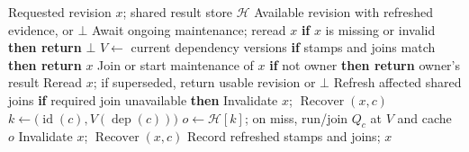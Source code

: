 \begin{algorithm}[t]
\caption{}
\label{alg:maintenance}
\normalsize
\begin{algorithmic}[1]
\Require Requested revision $x$; shared result store $\mathcal H$
\Ensure Available revision with refreshed evidence, or $\bot$
\State Await ongoing maintenance; reread $x$
\State \textbf{if} $x$ is missing or invalid \textbf{then return} $\bot$
\State $V\gets$ current dependency versions
\State \textbf{if} stamps and joins match \textbf{then return} $x$
\State Join or start maintenance of $x$
\State \textbf{if} not owner \textbf{then return} owner's result
\State Reread $x$; if superseded, return usable revision or $\bot$
\State Refresh affected shared joins
  \State \textbf{if} required join unavailable \textbf{then}
  \State \hspace{\algorithmicindent} Invalidate $x$; \Return $\operatorname{Recover}(x,c)$
  \State $k\gets\bigl(\operatorname{id}(c),V(\operatorname{dep}(c))\bigr)$
  \State $o\gets\mathcal H[k]$; on miss, run/join $Q_c$ at $V$ and cache $o$
    \State Invalidate $x$; \Return $\operatorname{Recover}(x,c)$
  \EndIf
\EndFor
\State Record refreshed stamps and joins; \Return $x$
\end{algorithmic}
\end{algorithm}
